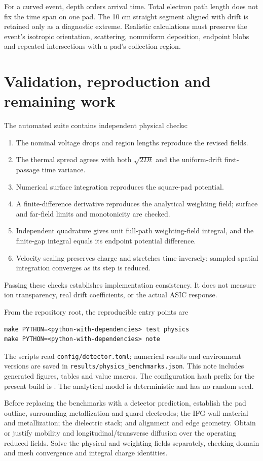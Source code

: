 \documentclass[11pt,a4paper]{article}
\begin{document}
For a curved event, depth orders arrival time. Total electron path length does
not fix the time span on one pad. The 10 cm straight segment aligned with drift
is retained only as a diagnostic extreme. Realistic calculations must preserve
the event's isotropic orientation, scattering, nonuniform deposition, endpoint
blobs and repeated intersections with a pad's collection region.

\clearpage
\section{Validation, reproduction and remaining work}
The automated suite contains independent physical checks:
\begin{enumerate}
\item The nominal voltage drops and region lengths reproduce the revised fields.
\item The thermal spread agrees with both $\sqrt{2Dt}$ and the uniform-drift
first-passage time variance.
\item Numerical surface integration reproduces the square-pad potential.
\item A finite-difference derivative reproduces the analytical weighting field;
surface and far-field limits and monotonicity are checked.
\item Independent quadrature gives unit full-path weighting-field integral,
and the finite-gap integral equals its endpoint potential difference.
\item Velocity scaling preserves charge and stretches time inversely; sampled
spatial integration converges as its step is reduced.
\end{enumerate}
Passing these checks establishes implementation consistency. It does not
measure ion transparency, real drift coefficients, or the actual ASIC response.

From the repository root, the reproducible entry points are
\begin{verbatim}
make PYTHON=<python-with-dependencies> test physics
make PYTHON=<python-with-dependencies> note
\end{verbatim}
The scripts read \texttt{config/detector.toml}; numerical results and environment
versions are saved in \texttt{results/physics\_benchmarks.json}. This note
includes generated figures, tables and value macros. The configuration hash
prefix for the present build is \texttt{\ConfigHash}. The analytical model is
deterministic and has no random seed.

Before replacing the benchmarks with a detector prediction, establish the pad
outline, surrounding metallization and guard electrodes; the IFG wall material
and metallization; the dielectric stack; and alignment and edge geometry.
Obtain or justify mobility and longitudinal/transverse diffusion over the
operating reduced fields. Solve the physical and weighting fields separately,
checking domain and mesh convergence and integral charge identities.
\end{document}
